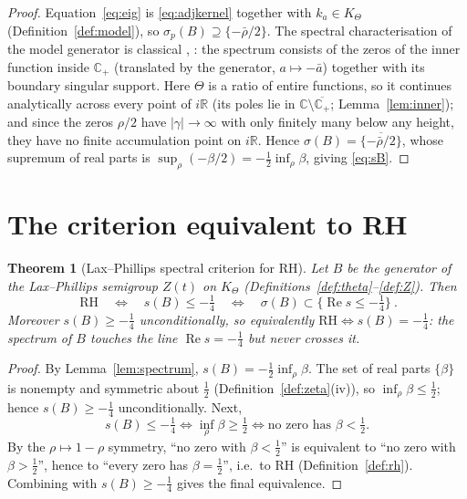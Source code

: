 \documentclass[11pt]{amsart}
\theoremstyle{plain}
\newtheorem{theorem}{Theorem}
\theoremstyle{definition}
\theoremstyle{remark}
\newcommand{\C}{\mathbb{C}}
\newcommand{\R}{\mathbb{R}}
\newcommand{\Cp}{\mathbb{C}_{+}}
\newcommand{\Kt}{K_{\Theta}}
\newcommand{\abs}[1]{\lvert #1 \rvert}
\renewcommand{\Re}{\operatorname{Re}}
\begin{document}
\begin{proof}
Equation~\eqref{eq:eig} is \eqref{eq:adjkernel} together with $k_{a}\in\Kt$
(Definition~\ref{def:model}), so $\sigma_{p}(B)\supseteq\{-\bar\rho/2\}$. The spectral
characterisation of the model generator is classical
\cite[Part~B]{nikolski}, \cite{sznagyfoias}: the spectrum consists of the zeros of the
inner function inside $\Cp$ (translated by the generator, $a\mapsto-\bar a$) together
with its boundary singular support. Here $\Theta$ is a ratio of entire functions, so it
continues analytically across every point of $i\R$ (its poles lie in
$\C\setminus\overline{\Cp}$; Lemma~\ref{lem:inner}); and since the zeros $\rho/2$ have
$\abs{\gamma}\to\infty$ with only finitely many below any height, they have no finite
accumulation point on $i\R$. Hence $\sigma(B)=\overline{\{-\bar\rho/2\}}$, whose
supremum of real parts is $\sup_{\rho}(-\beta/2)=-\tfrac12\inf_{\rho}\beta$, giving
\eqref{eq:sB}.
\end{proof}

\section{The criterion equivalent to RH}

\begin{theorem}[Lax--Phillips spectral criterion for RH]\label{thm:crit}
Let $B$ be the generator of the Lax--Phillips semigroup $Z(t)$ on $\Kt$
(Definitions~\ref{def:theta}--\ref{def:Z}). Then
\[
  \boxed{\ \mathrm{RH}\quad\Longleftrightarrow\quad s(B)\le-\tfrac14
          \quad\Longleftrightarrow\quad \sigma(B)\subset\{\Re s\le-\tfrac14\}\ }.
\]
Moreover $s(B)\ge-\tfrac14$ unconditionally, so equivalently
$\mathrm{RH}\iff s(B)=-\tfrac14$: the spectrum of $B$ touches the line
$\Re s=-\tfrac14$ but never crosses it.
\end{theorem}

\begin{proof}
By Lemma~\ref{lem:spectrum}, $s(B)=-\tfrac12\inf_{\rho}\beta$. The set of real parts
$\{\beta\}$ is nonempty and symmetric about $\tfrac12$ (Definition~\ref{def:zeta}(iv)),
so $\inf_{\rho}\beta\le\tfrac12$; hence $s(B)\ge-\tfrac14$ unconditionally. Next,
\[
  s(B)\le-\tfrac14\iff \inf_{\rho}\beta\ge\tfrac12
  \iff \text{no zero has }\beta<\tfrac12 .
\]
By the $\rho\mapsto1-\rho$ symmetry, ``no zero with $\beta<\tfrac12$'' is equivalent to
``no zero with $\beta>\tfrac12$'', hence to ``every zero has $\beta=\tfrac12$'', i.e.\ to
$\mathrm{RH}$ (Definition~\ref{def:rh}). Combining with $s(B)\ge-\tfrac14$ gives the
final equivalence.
\end{proof}
\end{document}
